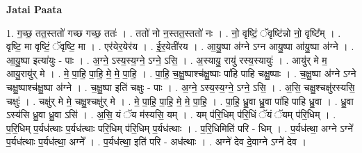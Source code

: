 \documentclass[17pt]{extarticle}
\begin{document}
\textbf{Jatai Paata} \newline

1. ग॒च्छ॒ तत॒स्ततो॑ गच्छ गच्छ॒ ततः॑ । . ततो॑ नो न॒स्तत॒स्ततो॑ नः । . नो॒ वृष्टिं॒ ॅवृष्टि॑न्नो नो॒ वृष्टि᳚म् । . वृष्टि॒ मा वृष्टिं॒ ॅवृष्टि॒ मा । . एर॑येर॒येर॑य । . ई॒र॒येती॑रय । . आ॒यु॒ष्पा अ॑ग्ने ऽग्न आयु॒ष्पा आ॑यु॒ष्पा अ॑ग्ने । . आ॒यु॒ष्पा इत्या॑युः - पाः । . अ॒ग्ने॒ ऽस्य॒स्य॒ग्ने॒ ऽग्ने॒ ऽसि॒ । . अ॒स्यायु॒ रायु॑ रस्य॒स्यायुः॑ । . आयु॑र् मे म॒ आयु॒रायु॑र् मे । . मे॒ पा॒हि॒ पा॒हि॒ मे॒ मे॒ पा॒हि॒ । . पा॒हि॒ च॒क्षु॒ष्पाश्च॑क्षु॒ष्पाः पा॑हि पाहि चक्षु॒ष्पाः । . च॒क्षु॒ष्पा अ॑ग्ने ऽग्ने चक्षु॒ष्पाश्च॑क्षु॒ष्पा अ॑ग्ने । . च॒क्षु॒ष्पा इति॑ चक्षुः - पाः । . अ॒ग्ने॒ ऽस्य॒स्य॒ग्ने॒ ऽग्ने॒ ऽसि॒ । . अ॒सि॒ चक्षु॒श्चक्षु॑रस्यसि॒ चक्षुः॑ । . चक्षु॑र् मे मे॒ चक्षु॒श्चक्षु॑र् मे । . मे॒ पा॒हि॒ पा॒हि॒ मे॒ मे॒ पा॒हि॒ । . पा॒हि॒ ध्रु॒वा ध्रु॒वा पा॑हि पाहि ध्रु॒वा । . ध्रु॒वा ऽस्य॑सि ध्रु॒वा ध्रु॒वा ऽसि॑ । . अ॒सि॒ यं ॅय म॑स्यसि॒ यम् । . यम् प॑रि॒धिम् प॑रि॒धिं ॅयं ॅयम् प॑रि॒धिम् । . प॒रि॒धिम् प॒र्यध॑त्थाः प॒र्यध॑त्थाः परि॒धिम् प॑रि॒धिम् प॒र्यध॑त्थाः । . प॒रि॒धिमिति॑ परि - धिम् । . प॒र्यध॑त्था॒ अग्ने ऽग्ने॑ प॒र्यध॑त्थाः प॒र्यध॑त्था॒ अग्ने᳚ । . प॒र्यध॑त्था॒ इति॑ परि - अध॑त्थाः । . अग्ने॑ देव दे॒वाग्ने ऽग्ने॑ देव । \newline
\end{document}
